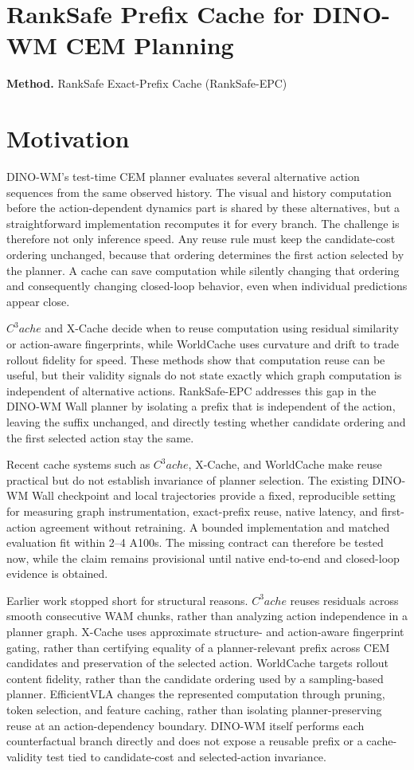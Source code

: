 \documentclass[10pt,a4paper]{article}
\begin{document}
\section*{RankSafe Prefix Cache for DINO-WM CEM Planning}
\textbf{Method.} RankSafe Exact-Prefix Cache (RankSafe-EPC)
\section*{Motivation}
DINO-WM's test-time CEM planner evaluates several alternative action sequences from the same observed history. The visual and history computation before the action-dependent dynamics part is shared by these alternatives, but a straightforward implementation recomputes it for every branch. The challenge is therefore not only inference speed. Any reuse rule must keep the candidate-cost ordering unchanged, because that ordering determines the first action selected by the planner. A cache can save computation while silently changing that ordering and consequently changing closed-loop behavior, even when individual predictions appear close.

\(C^{3}ache\) and X-Cache decide when to reuse computation using residual similarity or action-aware fingerprints, while WorldCache uses curvature and drift to trade rollout fidelity for speed. These methods show that computation reuse can be useful, but their validity signals do not state exactly which graph computation is independent of alternative actions. RankSafe-EPC addresses this gap in the DINO-WM Wall planner by isolating a prefix that is independent of the action, leaving the suffix unchanged, and directly testing whether candidate ordering and the first selected action stay the same.

Recent cache systems such as \(C^{3}ache\), X-Cache, and WorldCache make reuse practical but do not establish invariance of planner selection. The existing DINO-WM Wall checkpoint and local trajectories provide a fixed, reproducible setting for measuring graph instrumentation, exact-prefix reuse, native latency, and first-action agreement without retraining. A bounded implementation and matched evaluation fit within 2--4 A100s. The missing contract can therefore be tested now, while the claim remains provisional until native end-to-end and closed-loop evidence is obtained.

Earlier work stopped short for structural reasons. \(C^{3}ache\) reuses residuals across smooth consecutive WAM chunks, rather than analyzing action independence in a planner graph. X-Cache uses approximate structure- and action-aware fingerprint gating, rather than certifying equality of a planner-relevant prefix across CEM candidates and preservation of the selected action. WorldCache targets rollout content fidelity, rather than the candidate ordering used by a sampling-based planner. EfficientVLA changes the represented computation through pruning, token selection, and feature caching, rather than isolating planner-preserving reuse at an action-dependency boundary. DINO-WM itself performs each counterfactual branch directly and does not expose a reusable prefix or a cache-validity test tied to candidate-cost and selected-action invariance.
\end{document}
